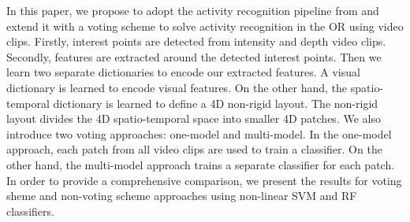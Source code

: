 \documentclass[a4paper, 10pt, conference]{ieeeconf}      %
\begin{document}
In this paper, we propose to adopt the activity recognition pipeline from \cite{c1} and extend it with a voting scheme to solve activity recognition in the OR using video clips. Firstly, interest points are detected from intensity and depth video clips. Secondly, features are extracted around the detected interest points. Then we learn two separate dictionaries to encode our extracted features. A visual dictionary is learned to encode visual features. On the other hand, the spatio-temporal dictionary is learned to define a 4D non-rigid layout. The non-rigid layout divides the 4D spatio-temporal space into smaller 4D patches. We also introduce two voting approaches: one-model and multi-model. In the one-model approach, each patch from all video clips are used to train a classifier. On the other hand, the multi-model approach trains a separate classifier for each patch. In order to provide a comprehensive comparison, we present the results for voting sheme and non-voting scheme approaches using non-linear SVM and RF classifiers.


\end{document}
